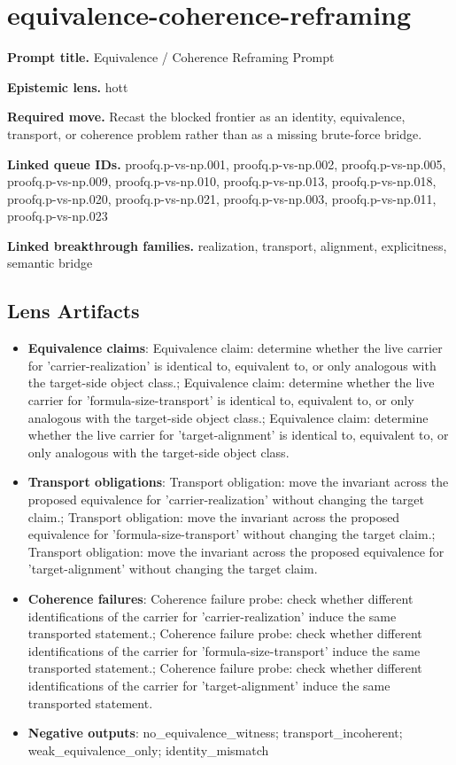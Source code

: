 \documentclass[11pt]{article}
\begin{document}
\section{equivalence-coherence-reframing}
\textbf{Prompt title.} Equivalence / Coherence Reframing Prompt

\textbf{Epistemic lens.} hott

\textbf{Required move.} Recast the blocked frontier as an identity, equivalence, transport, or coherence problem rather than as a missing brute-force bridge.

\textbf{Linked queue IDs.} proofq.p-vs-np.001, proofq.p-vs-np.002, proofq.p-vs-np.005, proofq.p-vs-np.009, proofq.p-vs-np.010, proofq.p-vs-np.013, proofq.p-vs-np.018, proofq.p-vs-np.020, proofq.p-vs-np.021, proofq.p-vs-np.003, proofq.p-vs-np.011, proofq.p-vs-np.023

\textbf{Linked breakthrough families.} realization, transport, alignment, explicitness, semantic bridge

\subsection*{Lens Artifacts}
\begin{itemize}[leftmargin=*,itemsep=0.2em]
\item \textbf{Equivalence claims}: Equivalence claim: determine whether the live carrier for 'carrier-realization' is identical to, equivalent to, or only analogous with the target-side object class.; Equivalence claim: determine whether the live carrier for 'formula-size-transport' is identical to, equivalent to, or only analogous with the target-side object class.; Equivalence claim: determine whether the live carrier for 'target-alignment' is identical to, equivalent to, or only analogous with the target-side object class.
\item \textbf{Transport obligations}: Transport obligation: move the invariant across the proposed equivalence for 'carrier-realization' without changing the target claim.; Transport obligation: move the invariant across the proposed equivalence for 'formula-size-transport' without changing the target claim.; Transport obligation: move the invariant across the proposed equivalence for 'target-alignment' without changing the target claim.
\item \textbf{Coherence failures}: Coherence failure probe: check whether different identifications of the carrier for 'carrier-realization' induce the same transported statement.; Coherence failure probe: check whether different identifications of the carrier for 'formula-size-transport' induce the same transported statement.; Coherence failure probe: check whether different identifications of the carrier for 'target-alignment' induce the same transported statement.
\item \textbf{Negative outputs}: no\_equivalence\_witness; transport\_incoherent; weak\_equivalence\_only; identity\_mismatch
\end{itemize}
\end{document}
